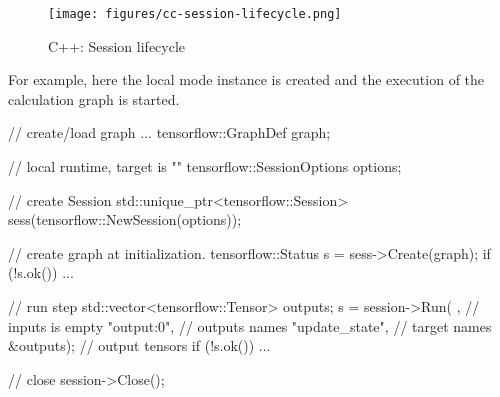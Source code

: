 \begin{content}
\begin{enum}
\end{enum}

\begin{figure}[H]
  \centering
  \texttt{[image: figures/cc-session-lifecycle.png]}
  \caption{C++: Session lifecycle}
  \label{fig:cc-session-lifecycle}
\end{figure}

For example, here the local mode  instance is created and the execution of the calculation graph is started.

\begin{leftbar}
\begin{c++}
// create/load graph ...
tensorflow::GraphDef graph;

// local runtime, target is ""
tensorflow::SessionOptions options;

// create Session
std::unique_ptr<tensorflow::Session> 
sess(tensorflow::NewSession(options));

// create graph at initialization.
tensorflow::Status s = sess->Create(graph);
if (!s.ok()) { ... }

// run step
std::vector<tensorflow::Tensor> outputs;
s = session->Run(
  {},               // inputs is empty
  {"output:0"},     // outputs names
  {"update_state"}, // target names
  &outputs);        // output tensors
if (!s.ok()) { ... }

// close
session->Close();
\end{c++}
\end{leftbar}

\end{content}



